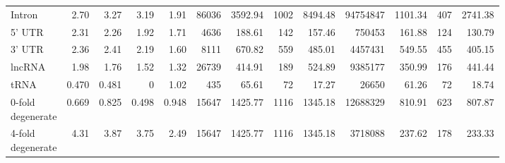 \begin{table}
\begin{tabular}{lrrrrrrrrrrrr}
        Intron                             & 2.70   & 3.27  & 3.19   & 1.91  & \num{86036} & \num{3592.94}  & \num{1002}  & \num{8494.48}  & \num{94754847}  & \num{1101.34}  & 407        & \num{2741.38} \\
        5' UTR                             & 2.31   & 2.26  & 1.92   & 1.71  & \num{4636}  & 188.61         & 142         & 157.46         & \num{750453}    & 161.88         & 124        & 130.79 \\
        3' UTR                             & 2.36   & 2.41  & 2.19   & 1.60  & \num{8111}  & 670.82         & 559         & 485.01         & \num{4457431}   & 549.55         & 455        & 405.15 \\
        lncRNA                             & 1.98   & 1.76  & 1.52   & 1.32  & \num{26739} & 414.91         & 189         & 524.89         & \num{9385177}   & 350.99         & 176        & 441.44 \\
        tRNA                               & 0.470  & 0.481 & 0      & 1.02  & \num{435}   & 65.61          & 72          & 17.27          & \num{26650}     & 61.26          & 72         & 18.74 \\
        \shortstack[l]{0-fold\\degenerate} & 0.669  & 0.825 & 0.498  & 0.948 & \num{15647} & \num{1425.77}  & \num{1116}  & \num{1345.18}  & \num{12688329}  & 810.91         & 623        & 807.87 \\
        \shortstack[l]{4-fold\\degenerate} & 4.31   & 3.87  & 3.75   & 2.49  & \num{15647} & \num{1425.77}  & \num{1116}  & \num{1345.18}  & \num{3718088}   & 237.62         & 178        & 233.33 \\
    \bottomrule
    \end{tabular}
\end{table}

